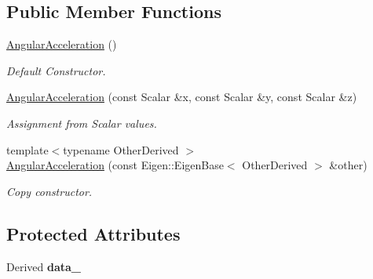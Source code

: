 \subsection*{Public Member Functions}
\begin{DoxyCompactItemize}
\item 
\hyperlink{classow__core_1_1AngularAcceleration_a24b5ba9e746b1056afa617dc35cc1909}{Angular\+Acceleration} ()\hypertarget{classow__core_1_1AngularAcceleration_a24b5ba9e746b1056afa617dc35cc1909}{}\label{classow__core_1_1AngularAcceleration_a24b5ba9e746b1056afa617dc35cc1909}

\begin{DoxyCompactList}\small\item\em Default Constructor. \end{DoxyCompactList}\item 
\hyperlink{classow__core_1_1AngularAcceleration_a3091dac3c3ba75b079b2f38675c735fb}{Angular\+Acceleration} (const Scalar \&x, const Scalar \&y, const Scalar \&z)\hypertarget{classow__core_1_1AngularAcceleration_a3091dac3c3ba75b079b2f38675c735fb}{}\label{classow__core_1_1AngularAcceleration_a3091dac3c3ba75b079b2f38675c735fb}

\begin{DoxyCompactList}\small\item\em Assignment from Scalar values. \end{DoxyCompactList}\item 
{\footnotesize template$<$typename Other\+Derived $>$ }\\\hyperlink{classow__core_1_1AngularAcceleration_a2d004049ef71a1522e61bce3ff5e4bfc}{Angular\+Acceleration} (const Eigen\+::\+Eigen\+Base$<$ Other\+Derived $>$ \&other)
\begin{DoxyCompactList}\small\item\em Copy constructor. \end{DoxyCompactList}\end{DoxyCompactItemize}
\subsection*{Protected Attributes}
\begin{DoxyCompactItemize}
\item 
Derived {\bfseries data\+\_\+}\hypertarget{classow__core_1_1AngularAcceleration_a799354c6062ef185d2f284ec9c483509}{}\label{classow__core_1_1AngularAcceleration_a799354c6062ef185d2f284ec9c483509}

\end{DoxyCompactItemize}


